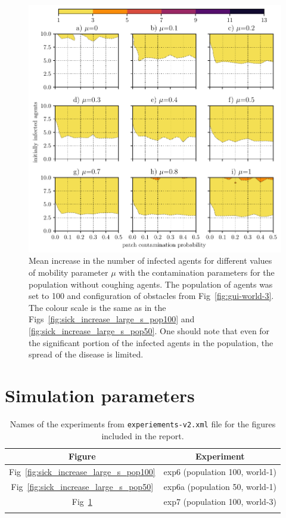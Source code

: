 \documentclass[11pt,a4paper]{article}
\begin{document}
\begin{figure}[ht!]
\includegraphics{plots/sick_increase_small_s_pop100_world-3.pdf}
\caption{Mean increase in the number of infected agents for different values of mobility parameter $\mu$ with the contamination parameters for the population without coughing agents. The population of agents was set to 100 and configuration of obstacles from Fig~\ref{fig:gui-world-3}. The colour scale is the same as in the Figs~\ref{fig:sick_increase_large_s_pop100} and \ref{fig:sick_increase_large_s_pop50}. One should note that even for the significant portion of the infected agents in the population, the spread of the disease is limited.}
\label{fig:sick_increase_small_s_pop100_world-3}
\end{figure}






\appendix

\section{Simulation parameters}

\begin{table}
\centering
\begin{tabular}{|c|c|}
\hline
\textbf{Figure} & \textbf{Experiment} \\
\hline
Fig~\ref{fig:sick_increase_large_s_pop100} & exp6  (population 100, world-1)\\
\hline
Fig~\ref{fig:sick_increase_large_s_pop50} & exp6a (population 50, world-1)\\ 
\hline
Fig~\ref{fig:sick_increase_small_s_pop100_world-3} & exp7 (population 100, world-3)  \\
\hline
 &  \\
\hline
\end{tabular}
\caption{Names of the experiments from \texttt{experiements-v2.xml} file for the figures included in the report.}
\end{table}
\end{document}
